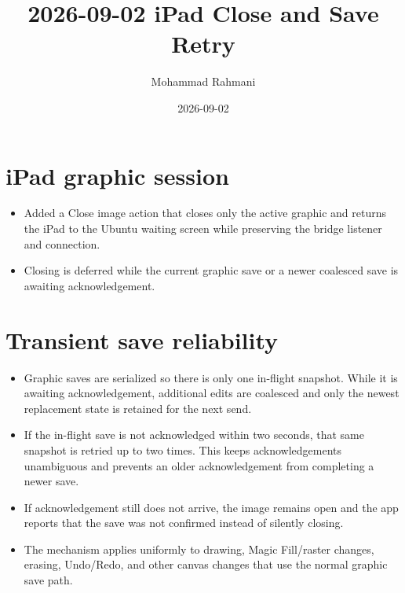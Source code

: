 \documentclass[a4paper]{article}
\title{2026-09-02 iPad Close and Save Retry}
\date{2026-09-02}
\author{Mohammad Rahmani}
\begin{document}
   \maketitle

   \section{iPad graphic session}
   \begin{itemize}
      \item Added a Close image action that closes only the active graphic and returns the iPad to the Ubuntu waiting screen while preserving the bridge listener and connection.
      \item Closing is deferred while the current graphic save or a newer coalesced save is awaiting acknowledgement.
   \end{itemize}

   \section{Transient save reliability}
   \begin{itemize}
      \item Graphic saves are serialized so there is only one in-flight snapshot. While it is awaiting acknowledgement, additional edits are coalesced and only the newest replacement state is retained for the next send.
      \item If the in-flight save is not acknowledged within two seconds, that same snapshot is retried up to two times. This keeps acknowledgements unambiguous and prevents an older acknowledgement from completing a newer save.
      \item If acknowledgement still does not arrive, the image remains open and the app reports that the save was not confirmed instead of silently closing.
      \item The mechanism applies uniformly to drawing, Magic Fill/raster changes, erasing, Undo/Redo, and other canvas changes that use the normal graphic save path.
   \end{itemize}

   
   
\end{document}
